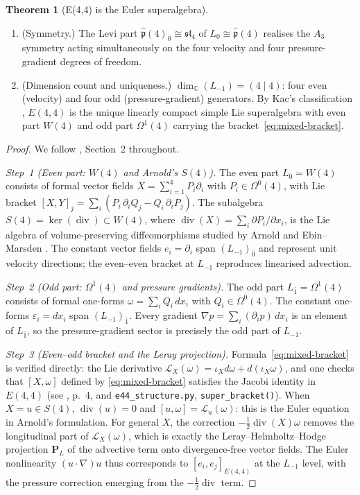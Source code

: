 \documentclass[reqno,10pt]{amsart}
\theoremstyle{definition}
\newtheorem{theor}[subsubsection]{Theorem}
\def\Wn{W(4)}
\def\Sn{S(4)}
\def\Cset{{\mathbb{C}}}
\def\divX{{\operatorname{div}}}
\def\phat{\hat{\mathfrak{p}}}
\def\slN{{\mathfrak{sl}}_4}
\begin{document}
\begin{theor}[E(4,4) is the Euler superalgebra]
\begin{enumerate}
\item[(vi)] \textup{(Symmetry.)}
The Levi part $\phat(4)_0\cong\slN$ of $L_0\cong\phat(4)$ realises the
$A_3$ symmetry acting simultaneously on the four velocity and four
pressure-gradient degrees of freedom.

\item[(vii)] \textup{(Dimension count and uniqueness.)}
$\dim_{\Cset}(L_{-1}) = (4\mid 4)$: four even (velocity) and four odd
(pressure-gradient) generators.  By Kac's classification \cite{Kac1998},
$E(4,4)$ is the unique linearly compact simple Lie superalgebra with even
part $\Wn$ and odd part $\Omega^1(4)$ carrying the bracket~\eqref{eq:mixed-bracket}.
\end{enumerate}
\end{theor}

\begin{proof}
We follow \cite{CCK2026}, Section~2 throughout.

\smallskip
\noindent\textit{Step~1 (Even part: $\Wn$ and Arnold's $\Sn$).}
The even part $L_{\bar 0} = \Wn$ consists of formal vector fields
$X = \sum_{i=1}^4 P_i\partial_i$ with $P_i\in\Omega^0(4)$, with Lie bracket
$[X,Y]_j = \sum_i(P_i\,\partial_i Q_j - Q_i\,\partial_i P_j)$.
The subalgebra $\Sn = \ker(\divX)\subset\Wn$, where
$\divX(X) = \sum_i\partial P_i/\partial x_i$, is the Lie algebra of
volume-preserving diffeomorphisms studied by Arnold \cite{Arnold1966} and
Ebin--Marsden \cite{EbinMarsden1970}.  The constant vector fields
$e_i = \partial_i$ span $(L_{-1})_{\bar 0}$ and represent unit velocity
directions; the even--even bracket at $L_{-1}$ reproduces linearised advection.

\smallskip
\noindent\textit{Step~2 (Odd part: $\Omega^1(4)$ and pressure gradients).}
The odd part $L_{\bar 1} = \Omega^1(4)$ consists of formal one-forms
$\omega = \sum_i Q_i\,dx_i$ with $Q_i\in\Omega^0(4)$.  The constant
one-forms $\varepsilon_i = dx_i$ span $(L_{-1})_{\bar 1}$.  Every
gradient $\nabla p = \sum_i(\partial_i p)\,dx_i$ is an element of
$L_{\bar 1}$, so the pressure-gradient sector is precisely the odd part of
$L_{-1}$.

\smallskip
\noindent\textit{Step~3 (Even--odd bracket and the Leray projection).}
Formula~\eqref{eq:mixed-bracket} is verified directly: the Lie derivative
$\mathcal{L}_X(\omega) = \iota_X d\omega + d(\iota_X\omega)$, and one checks
that $[X,\omega]$ defined by \eqref{eq:mixed-bracket} satisfies the Jacobi
identity in $E(4,4)$ (see \cite{CCK2026}, p.~4, and \texttt{e44\_structure.py},
\texttt{super\_bracket()}).  When $X = u\in\Sn$, $\divX(u) = 0$
and $[u,\omega] = \mathcal{L}_u(\omega)$: this is the Euler equation in
Arnold's formulation.  For general $X$, the correction
$-\tfrac{1}{2}\divX(X)\omega$ removes the longitudinal part of
$\mathcal{L}_X(\omega)$, which is exactly the Leray--Helmholtz--Hodge
projection $\mathbf{P}_L$ of the advective term onto divergence-free
vector fields.  The Euler nonlinearity $(u\cdot\nabla)u$ thus corresponds
to $[e_i,e_j]_{E(4,4)}$ at the $L_{-1}$ level, with the pressure correction
emerging from the $-\tfrac{1}{2}\divX$ term.


\end{proof}
\end{document}
